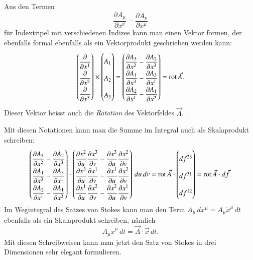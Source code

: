 Aus den Termen
\[
\frac{\partial A_\mu}{\partial x^\nu}
-
\frac{\partial A_\nu}{\partial x^\mu}
\]
für Indextripel mit verschiedenen Indizes kann man einen Vektor
formen, der ebenfalls formal ebenfalls als ein Vektorprodukt
geschrieben werden kann:
\[
{
\def\arraystretch{1.9}
\begin{pmatrix}
\displaystyle \frac{\partial}{\partial x^1}\\
\displaystyle \frac{\partial}{\partial x^2}\\
\displaystyle \frac{\partial}{\partial x^3}
\end{pmatrix}
}
\times
\begin{pmatrix}
A_1\\A_2\\A_3
\end{pmatrix}
=
{
\def\arraystretch{1.9}
\begin{pmatrix}
\displaystyle
\frac{\partial A_3}{\partial x^2}-\frac{\partial A_2}{\partial x^3}\\
\displaystyle
\frac{\partial A_1}{\partial x^3}-\frac{\partial A_3}{\partial x^1}\\
\displaystyle
\frac{\partial A_2}{\partial x^1}-\frac{\partial A_1}{\partial x^2}
\end{pmatrix}
}
=
\operatorname{rot}\vec A.
\]
Dieser Vektor heisst auch die {\em Rotation} des Vektorfeldes $\vec A$.
.

Mit diesen Notationen kann man die Summe im Integral auch als Skalaprodukt
schreiben:
\[
{
\def\arraystretch{2.0}
\begin{pmatrix}
\displaystyle
\frac{\partial A_3}{\partial x^2}-\frac{\partial A_2}{\partial x^3}\\
\displaystyle
\frac{\partial A_1}{\partial x^3}-\frac{\partial A_3}{\partial x^1}\\
\displaystyle
\frac{\partial A_2}{\partial x^1}-\frac{\partial A_1}{\partial x^2}
\end{pmatrix}
\cdot
\begin{pmatrix}
\displaystyle
\frac{\partial x^2}{\partial u}\frac{\partial x^3}{\partial v}
-
\frac{\partial x^3}{\partial u}\frac{\partial x^2}{\partial v}
\\
\displaystyle
\frac{\partial x^3}{\partial u}\frac{\partial x^1}{\partial v}
-
\frac{\partial x^1}{\partial u}\frac{\partial x^3}{\partial v}
\\
\displaystyle
\frac{\partial x^1}{\partial u}\frac{\partial x^2}{\partial v}
-
\frac{\partial x^2}{\partial u}\frac{\partial x^1}{\partial v}
\end{pmatrix}
\,du\,dv
}
=
\operatorname{rot}\vec A\cdot
\begin{pmatrix}
df^{23}\\
df^{31}\\
df^{12}
\end{pmatrix}
=
\operatorname{rot}\vec A
\cdot
d\vec f.
\]
Im Wegintegral des Satzes von Stokes kann man den Term 
$A_\mu\,dx^\mu=A_\mu \dot x^\mu\,dt$ ebenfalls als ein
Skalaprodukt schreiben, nämlich
\[
A_\mu \dot x^\mu\,dt = \vec A\cdot \dot{\vec x}\,dt.
\]
Mit diesen Schreibweisen kann man jetzt den Satz von Stokes in
drei Dimensionen sehr elegant formulieren.


